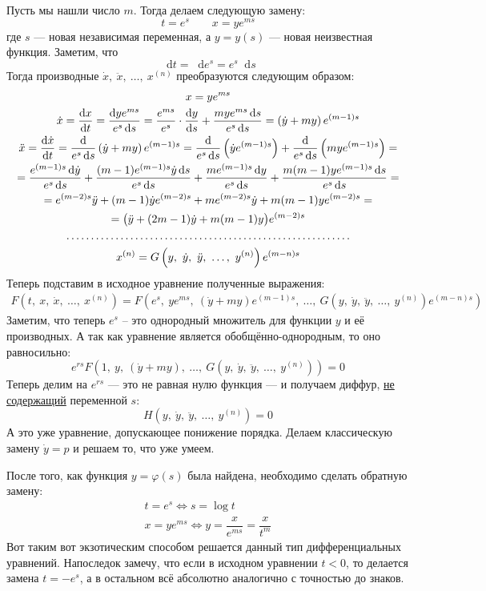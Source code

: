\documentclass[a4paper,12pt]{article}
\newcommand{\dotffill}[1]{\parbox[t]{#1}{\dotfill}}
\renewcommand*\d{\mathop{}\!\mathrm{d}}
\newcommand{\dy}{\dot{y}}
\newcommand{\ddy}{\ddot{y}}
\newcommand{\dx}{\dot{x}}
\newcommand{\ddx}{\ddot{x}}
\newcommand{\fe}{\varphi}
\begin{document}
Пусть мы нашли число $m$. Тогда делаем следующую замену:
\[t = e^s\qquad x = ye^{ms}\]
где $s$ --- новая независимая переменная, а $y = y(s)$ --- новая неизвестная функция. Заметим, что \[\d t = \d e^s = e^s \d s\] Тогда производные $\dx,\ \ddx,\ \ldots,\ x^{(n)}$ преобразуются следующим образом:
\begin{gather*}
	x = ye^{ms}\\
	\dx = \dfrac{\d x}{\d t} = \dfrac{\d ye^{ms}}{e^s \d s} = \dfrac{e^{ms}}{e^s}\cdot \dfrac{\d y}{\d s} + \dfrac{mye^{ms}\d s}{e^s \d s} = \left(\dy + my\right)e^{(m - 1)s}\\
	\ddx = \dfrac{\d \dx}{\d t} = \dfrac{\d}{e^s\d s}\left(\dy + my\right)e^{(m - 1)s} = \dfrac{\d}{e^s\d s}\left(\dy e^{(m - 1)s}\right) + \dfrac{\d}{e^s\d s}\left(mye^{(m - 1)s}\right) = \\
	= \dfrac{e^{(m - 1)s}\d\dy}{e^s\d s} + \dfrac{(m - 1)e^{(m - 1)s}\dy\d s}{e^s\d s} + \dfrac{me^{(m - 1)s}\d y}{e^s\d s} + \dfrac{m(m - 1)ye^{(m - 1)s}\d s}{e^s\d s} = \\
	= e^{(m - 2)s}\ddy + (m - 1)\dy e^{(m - 2)s} + me^{(m - 2)s}\dy + m(m - 1)ye^{(m - 2)s} = \\
	= \big(\ddy + (2m - 1)\dy + m(m - 1)y\big)e^{(m - 2)s}\\
	\dotffill{0.75\textwidth}\\
	x^{(n)} = G\left(y,\  \dy,\ \ddy,\ \ldots,\ y^{(n)}\right)e^{(m - n)s}
\end{gather*}
Теперь подставим в исходное уравнение полученные выражения:
\begin{gather*}
	F\left(t,\ x,\ \dx,\ \ldots,\ x^{(n)}\right) = F\left(e^s,\ ye^{ms},\ \left(\dy + my\right)e^{(m - 1)s},\ \ldots,\ G\left(y,\  \dy,\ \ddy,\ \ldots,\ y^{(n)}\right)e^{(m - n)s}\right)
\end{gather*}
Заметим, что теперь $e^s$ -- это однородный множитель для функции $y$ и её производных. А так как уравнение является обобщённо-однородным, то оно равносильно:
\[
	e^{rs}F\left(1,\ y,\ \left(\dy + my\right),\ \ldots,\ G\left(y,\  \dy,\ \ddy,\ \ldots,\ y^{(n)}\right)\right) = 0
\]
Теперь делим на $e^{rs}$ --- это не равная нулю функция --- и получаем диффур, \underline{не содержащий} переменной $s$:
\[H\left(y,\ \dy,\ \ddy,\ \ldots,\ y^{(n)}\right) = 0\]
А это уже уравнение, допускающее понижение порядка. Делаем классическую замену $\dy = p$ и решаем то, что уже умеем.

После того, как функция $y = \fe(s)$ была найдена, необходимо сделать обратную замену:
\begin{gather*}
	t = e^s \iff s = \log t\\
	x = ye^{ms} \iff y = \dfrac{x}{e^{ms}} = \dfrac{x}{t^m}
\end{gather*}
Вот таким вот экзотическим способом решается данный тип дифференциальных уравнений. Напоследок замечу, что если в исходном уравнении $t < 0$, то делается замена $t = -e^s$, а в остальном всё абсолютно аналогично с точностью до знаков.
\ \\
\end{document}
